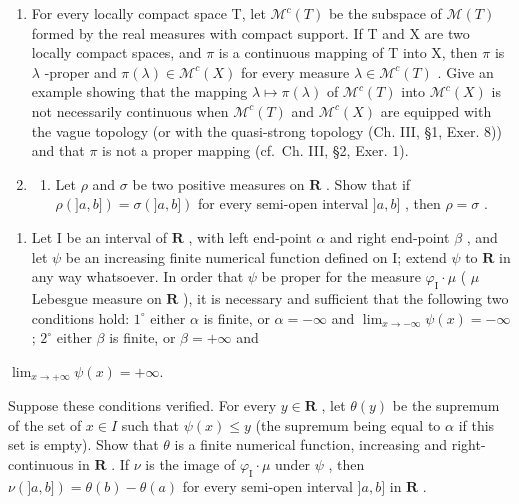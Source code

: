 \begin{enumerate}
\def\labelenumi{\arabic{enumi})}
\setcounter{enumi}{3}
\item
  For every locally compact space T, let \(\mathcal{M}^{c}(T)\) be the subspace of \(\mathcal{M}(T)\) formed by the real measures with compact support. If T and X are two locally compact spaces, and \(\pi\) is a continuous mapping of T into X, then \(\pi\) is \(\lambda\) -proper and \(\pi(\lambda) \in \mathcal{M}^{c}(X)\) for every measure \(\lambda \in \mathcal{M}^{c}(T)\) . Give an example showing that the mapping \(\lambda \mapsto \pi(\lambda)\) of \(\mathcal{M}^{c}(T)\) into \(\mathcal{M}^{c}(X)\) is not necessarily continuous when \(\mathcal{M}^{c}(T)\) and \(\mathcal{M}^{c}(X)\) are equipped with the vague topology (or with the quasi-strong topology (Ch. III, §1, Exer. 8)) and that \(\pi\) is not a proper mapping (cf.~Ch. III, §2, Exer. 1).
\item
  \begin{enumerate}
  \def\labelenumii{\alph{enumii})}
  \tightlist
  \item
    Let \(\rho\) and \(\sigma\) be two positive measures on \(\mathbf{R}\) . Show that if \(\rho(]a,b]) = \sigma(]a,b])\) for every semi-open interval \(]a,b]\) , then \(\rho = \sigma\) .
  \end{enumerate}
\end{enumerate}

\begin{enumerate}
\def\labelenumi{\alph{enumi})}
\setcounter{enumi}{1}
\tightlist
\item
  Let I be an interval of \(\mathbf{R}\) , with left end-point \(\alpha\) and right end-point \(\beta\) , and let \(\psi\) be an increasing finite numerical function defined on I; extend \(\psi\) to \(\mathbf{R}\) in any way whatsoever. In order that \(\psi\) be proper for the measure \(\varphi_{\mathrm{I}} \cdot \mu\) ( \(\mu\) Lebesgue measure on \(\mathbf{R}\) ), it is necessary and sufficient that the following two conditions hold: \(1^{\circ}\) either \(\alpha\) is finite, or \(\alpha = -\infty\) and \(\lim_{x \to -\infty} \psi(x) = -\infty\) ; \(2^{\circ}\) either \(\beta\) is finite, or \(\beta = +\infty\) and
\end{enumerate}

\(\lim_{x\to +\infty}\psi (x) = +\infty .\)

Suppose these conditions verified. For every \(y \in \mathbf{R}\) , let \(\theta(y)\) be the supremum of the set of \(x \in I\) such that \(\psi(x) \leqslant y\) (the supremum being equal to \(\alpha\) if this set is empty). Show that \(\theta\) is a finite numerical function, increasing and right-continuous in \(\mathbf{R}\) . If \(\nu\) is the image of \(\varphi_{\mathrm{I}} \cdot \mu\) under \(\psi\) , then \(\nu(]a,b]) = \theta(b) - \theta(a)\) for every semi-open interval \(]a,b]\) in \(\mathbf{R}\) .

